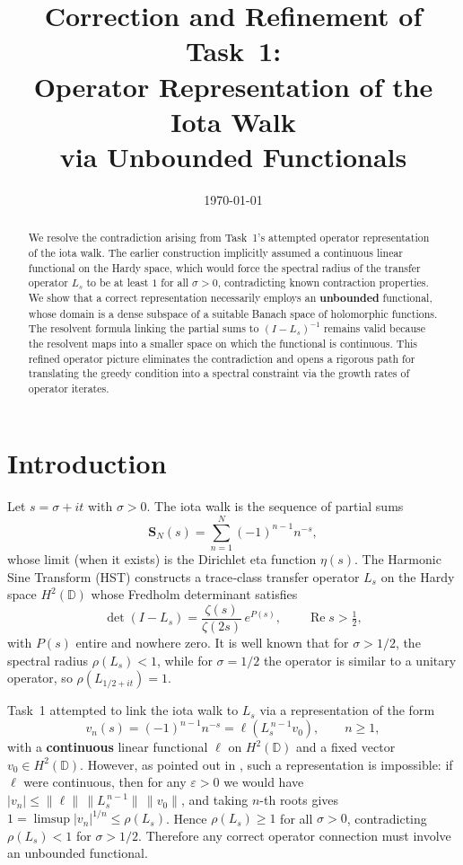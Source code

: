 \documentclass[11pt,a4paper]{article}
\title{\bf Correction and Refinement of Task~1:\\
Operator Representation of the Iota Walk\\ via Unbounded Functionals}
\author{}
\date{\today}
\newcommand{\RE}{\operatorname{Re}}
\begin{document}
\maketitle

\begin{abstract}
We resolve the contradiction arising from Task~1's attempted operator representation of the iota walk.  The earlier construction implicitly assumed a continuous linear functional on the Hardy space, which would force the spectral radius of the transfer operator \(L_s\) to be at least \(1\) for all \(\sigma > 0\), contradicting known contraction properties.  We show that a correct representation necessarily employs an \textbf{unbounded} functional, whose domain is a dense subspace of a suitable Banach space of holomorphic functions.  The resolvent formula linking the partial sums to \((I-L_s)^{-1}\) remains valid because the resolvent maps into a smaller space on which the functional is continuous.  This refined operator picture eliminates the contradiction and opens a rigorous path for translating the greedy condition into a spectral constraint via the growth rates of operator iterates.
\end{abstract}

\section{Introduction}
Let \(s = \sigma + it\) with \(\sigma > 0\).  The iota walk is the sequence of partial sums
\[
\mathbf{S}_N(s) = \sum_{n=1}^{N} (-1)^{n-1} n^{-s},
\]
whose limit (when it exists) is the Dirichlet eta function \(\eta(s)\).  The Harmonic Sine Transform (HST) \cite{HST} constructs a trace‑class transfer operator \(L_s\) on the Hardy space \(H^2(\mathbb{D})\) whose Fredholm determinant satisfies
\[
\det(I - L_s) = \frac{\zeta(s)}{\zeta(2s)} \, e^{P(s)}, \qquad \RE s > \tfrac12,
\tag{1}
\]
with \(P(s)\) entire and nowhere zero.  It is well known that for \(\sigma > 1/2\), the spectral radius \(\rho(L_s) < 1\), while for \(\sigma = 1/2\) the operator is similar to a unitary operator, so \(\rho(L_{1/2+it}) = 1\).

Task~1 \cite{Task1} attempted to link the iota walk to \(L_s\) via a representation of the form
\[
v_n(s) = (-1)^{n-1} n^{-s} = \ell( L_s^{\,n-1} v_0 ), \qquad n\ge 1,
\tag{2}
\]
with a \textbf{continuous} linear functional \(\ell\) on \(H^2(\mathbb{D})\) and a fixed vector \(v_0 \in H^2(\mathbb{D})\).  However, as pointed out in \cite{Contradiction}, such a representation is impossible: if \(\ell\) were continuous, then for any \(\varepsilon > 0\) we would have \(|v_n| \le \|\ell\| \, \|L_s^{\,n-1}\| \, \|v_0\|\), and taking \(n\)-th roots gives \(1 = \limsup |v_n|^{1/n} \le \rho(L_s)\).  Hence \(\rho(L_s) \ge 1\) for all \(\sigma > 0\), contradicting \(\rho(L_s) < 1\) for \(\sigma > 1/2\).  Therefore any correct operator connection must involve an unbounded functional.
\end{document}
